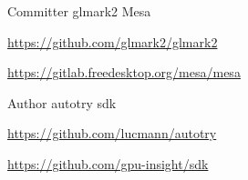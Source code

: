 
\begin{cventries}
  \cventry
    {Committer} %
    {glmark2 \hspace{0.2cm} Mesa} %
    {\hspace{1cm}} %
    {} %
    {
      \begin{cvitems} %
        \item {\url{https://github.com/glmark2/glmark2}}
        \item {\url{https://gitlab.freedesktop.org/mesa/mesa}}
      \end{cvitems}
    }

  \cventry
    {Author} %
    {autotry \hspace{0.2cm} sdk} %
    {\hspace{1cm}} %
    {} %
    {
      \begin{cvitems} %
        \item {\url{https://github.com/lucmann/autotry}}
        \item {\url{https://github.com/gpu-insight/sdk}}
      \end{cvitems}
    }
\end{cventries}
